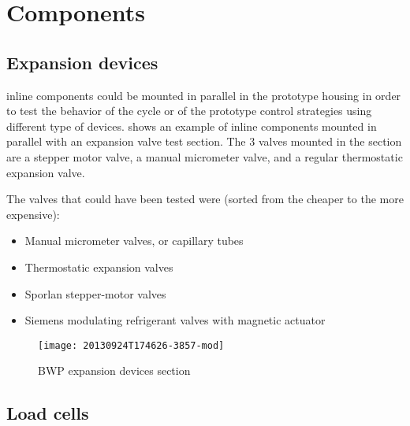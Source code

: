 \section{Components}
\label{sec:bwp-components}

\subsection{Expansion devices}
\label{sec:bwp-exp-devices}

\BWP{} inline components could be mounted in parallel in the prototype
housing in order to test the behavior of the cycle or of the prototype
control strategies using different type of
devices.  shows an example of inline
components mounted in parallel with an expansion valve test
section. The 3 valves mounted in the section are a stepper motor
valve, a manual micrometer valve, and a regular thermostatic expansion
valve.

The valves that could have been tested were (sorted from the cheaper
to the more expensive):

\begin{itemize}
\item Manual micrometer valves, or capillary tubes
\item Thermostatic expansion valves
\item Sporlan stepper-motor valves
\item Siemens modulating refrigerant valves with magnetic
  actuator
\end{itemize}

\begin{figure}[htbp]
  \centering
  \texttt{[image: 20130924T174626-3857-mod]}
  \caption{BWP expansion devices section}
  \label{fig:bwp_exp_sections}
\end{figure}


\subsection{Load cells}
\label{sec:bwp-load-cells}

